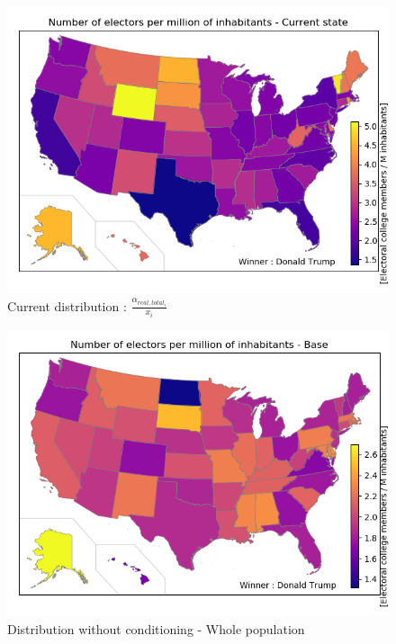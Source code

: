 \documentclass[a4paper,10pt,calibri,oneside,openany, twocolumn]{report}
\theoremstyle{break}
\begin{document}
\begin{figure}[H]
	\vspace*{1.8cm}
	\centering
	\includegraphics[width=\linewidth]{mapCurrentTotal}
	\caption{Current distribution : $\frac{\alpha_{real,total_i}}{x_i}$}
\end{figure}
\begin{figure}[H]
	\vspace*{0.3cm}

	\centering
	\includegraphics[width=\linewidth]{mapTotalBase}
	\caption{Distribution without conditioning - Whole population}
\end{figure}
\end{document}
